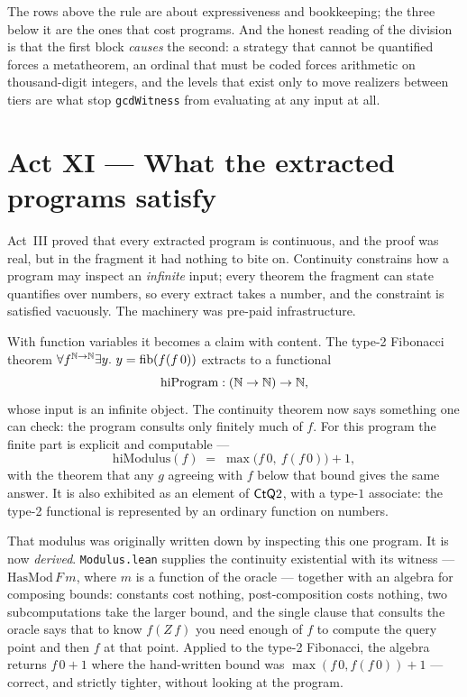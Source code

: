 The rows above the rule are about expressiveness and bookkeeping; the three
below it are the ones that cost programs. And the honest reading of the
division is that the first block \emph{causes} the second: a strategy that
cannot be quantified forces a metatheorem, an ordinal that must be coded
forces arithmetic on thousand-digit integers, and the levels that exist only
to move realizers between tiers are what stop \texttt{gcdWitness} from
evaluating at any input at all.

\section{Act XI --- What the extracted programs satisfy}

Act~III proved that every extracted program is continuous, and the proof was
real, but in the fragment it had nothing to bite on. Continuity constrains how
a program may inspect an \emph{infinite} input; every theorem the fragment can
state quantifies over numbers, so every extract takes a number, and the
constraint is satisfied vacuously. The machinery was pre-paid infrastructure.

With function variables it becomes a claim with content. The type-2 Fibonacci
theorem $\forall f^{\mathbb{N}\to\mathbb{N}}\exists y.\ y = \operatorname{fib}(f(f\,0))$ extracts to a
functional
\[
  \mathrm{hiProgram} : (\mathbb{N}\to\mathbb{N}) \to \mathbb{N} ,
\]
whose input is an infinite object. The continuity theorem now says something
one can check: the program consults only finitely much of $f$. For this
program the finite part is explicit and computable ---
\[
  \mathrm{hiModulus}(f) \;=\; \max\bigl(f\,0,\ f(f\,0)\bigr) + 1 ,
\]
with the theorem that any $g$ agreeing with $f$ below that bound gives the
same answer. It is also exhibited as an element of $\mathsf{CtQ} 2$, with a type-$1$
associate: the type-2 functional is represented by an ordinary function on
numbers.

That modulus was originally written down by inspecting this one program.
It is now \emph{derived}. \texttt{Modulus.lean} supplies the continuity
existential with its witness --- $\mathrm{HasMod}\,F\,m$, where $m$ is a
function of the oracle --- together with an algebra for composing bounds:
constants cost nothing, post-composition costs nothing, two subcomputations
take the larger bound, and the single clause that consults the oracle says
that to know $f(Z\,f)$ you need enough of $f$ to compute the query point and
then $f$ at that point. Applied to the type-2 Fibonacci, the algebra returns
$f\,0 + 1$ where the hand-written bound was $\max(f\,0, f(f\,0)) + 1$ ---
correct, and strictly tighter, without looking at the program.

